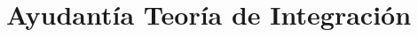 \documentclass[a4paper]{report}
\title{Ayudantía Teoría de Integración}
\author{}
\begin{document}
	\maketitle
	\tableofcontents

	\chapter{}
	
	
	
	

\end{document}

